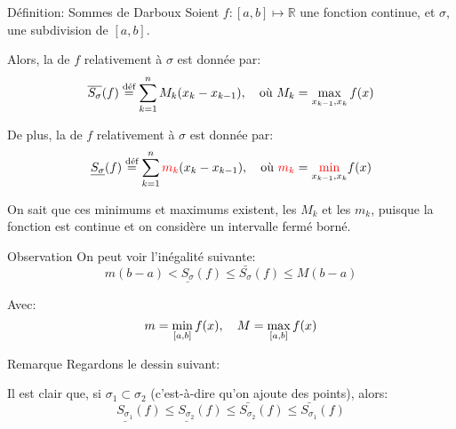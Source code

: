 \documentclass[a4paper]{article}
\begin{document}
\begin{parag}{Définition: Sommes de Darboux}
    Soient $f : \left[a, b\right] \mapsto \mathbb{R}$ une fonction continue, et $\sigma$, une subdivision de $\left[a, b\right]$.

    Alors, la  de $f$ relativement à $\sigma$ est donnée par: 
    \[\bar{S_{\sigma}}\left(f\right) \over{=}{déf} \sum_{k=1}^{n} M_k\left(x_k - x_{k - 1}\right), \mathspace \text{où } M_k = \max_{x_{k-1}, x_k}f\left(x\right)\]
    
    De plus, la  de $f$ relativement à $\sigma$ est donnée par:
    \[\underline{S_{\sigma}}\left(f\right) \over{=}{déf} \sum_{k=1}^{n} {\color{red}m_k}\left(x_k - x_{k - 1}\right), \mathspace \text{où } {\color{red}m_k} = {\color{red}\min_{{\color{black}x_{k-1}, x_k}}}f\left(x\right)\]

    On sait que ces minimums et maximums existent, les $M_k$ et les $m_k$, puisque la fonction est continue et on considère un intervalle fermé borné.


    \begin{subparag}{Observation}
        On peut voir l'inégalité suivante:
        \[m\left(b - a\right) < \underline{S_{\sigma}}\left(f\right) \leq \bar{S_{\sigma}}\left(f\right) \leq M\left(b - a\right)\]
        
        Avec: 
        \[m = \min_{\left[a, b\right]} f\left(x\right), \mathspace M = \max_{\left[a, b\right]}f\left(x\right)\]
    \end{subparag}
\end{parag}

\begin{parag}{Remarque}
    Regardons le dessin suivant:

    Il est clair que, si $\sigma_1 \subset \sigma_2$ (c'est-à-dire qu'on ajoute des points), alors:
    \[\underline{S_{\sigma_1}}\left(f\right) \leq \underline{S_{\sigma_2}}\left(f\right) \leq \bar{S_{\sigma_2}}\left(f\right) \leq \bar{S_{\sigma_1}}\left(f\right)\]
\end{parag}
\end{document}
